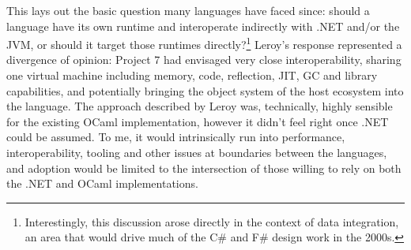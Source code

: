 \documentclass[acmsmall,screen]{acmart}
\begin{document}
This lays out the basic question many languages have faced since: should a language have its own runtime and interoperate indirectly with .NET and/or the JVM, or
should it target those runtimes directly?\footnote{Interestingly, this discussion arose directly in the context of data integration, an area that would drive much
of the C\# and F\# design work in the 2000s.}  Leroy’s response represented a divergence of opinion: Project 7 had envisaged very close interoperability, sharing
one virtual machine including memory, code, reflection, JIT, GC and library capabilities, and potentially bringing the object system of the host ecosystem into the
language.  The approach described by Leroy was, technically, highly sensible for the existing OCaml implementation, however it didn’t feel right once .NET could be
assumed. To me, it would intrinsically run into performance, interoperability, tooling and other issues at boundaries between the languages, and adoption would be
limited to the intersection of those willing to rely on both the .NET and OCaml implementations.
\end{document}
